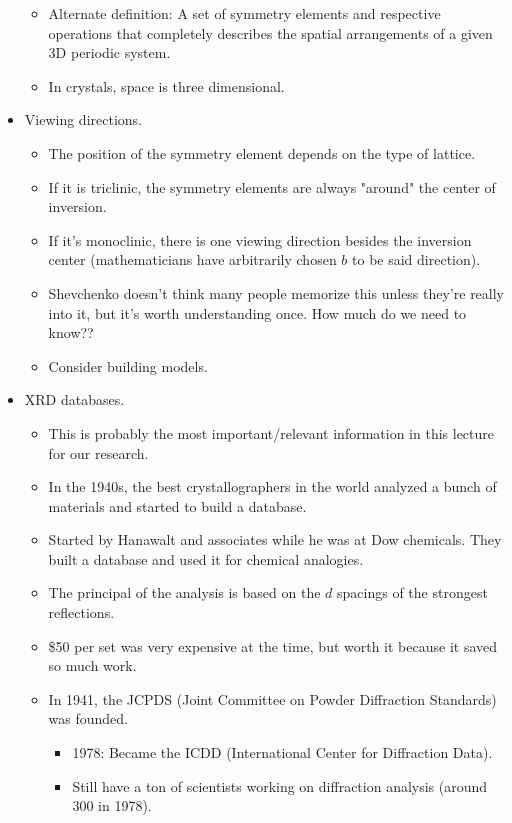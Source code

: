 \documentclass[../notes.tex]{subfiles}
\begin{document}
\begin{itemize}
\begin{itemize}
        \item Alternate definition: A set of symmetry elements and respective operations that completely describes the spatial arrangements of a given 3D periodic system.
        \item In crystals, space is three dimensional.
    \end{itemize}
    \item Viewing directions.
    \begin{itemize}
        \item The position of the symmetry element depends on the type of lattice.
        \item If it is triclinic, the symmetry elements are always "around" the center of inversion.
        \item If it's monoclinic, there is one viewing direction besides the inversion center (mathematicians have arbitrarily chosen $b$ to be said direction).
        \item Shevchenko doesn't think many people memorize this unless they're really into it, but it's worth understanding once. How much do we need to know??
        \item Consider building models.
    \end{itemize}
    \item XRD databases.
    \begin{itemize}
        \item This is probably the most important/relevant information in this lecture for our research.
        \item In the 1940s, the best crystallographers in the world analyzed a bunch of materials and started to build a database.
        \item Started by Hanawalt and associates while he was at Dow chemicals. They built a database and used it for chemical analogies.
        \item The principal of the analysis is based on the $d$ spacings of the strongest reflections.
        \item \$50 per set was very expensive at the time, but worth it because it saved so much work.
        \item In 1941, the JCPDS (Joint Committee on Powder Diffraction Standards) was founded.
        \begin{itemize}
            \item 1978: Became the ICDD (International Center for Diffraction Data).
            \item Still have a ton of scientists working on diffraction analysis (around 300 in 1978).

\end{itemize}
\end{itemize}
\end{itemize}
\end{document}
